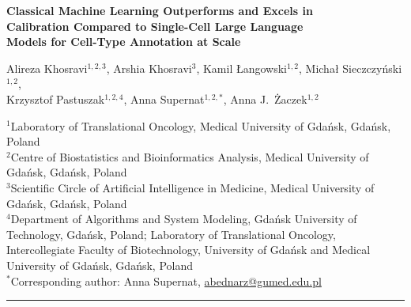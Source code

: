 \documentclass[11pt,a4paper]{article}
\begin{document}
\begin{titlepage}
\begin{center}

\vspace*{1cm}

{\LARGE\bfseries\color{darkblue}
Classical Machine Learning Outperforms and Excels in\\[4pt]
Calibration Compared to Single-Cell Large Language\\[4pt]
Models for Cell-Type Annotation at Scale
}

\vspace{1.5cm}

{\large
Alireza Khosravi$^{1,2,3}$,\quad
Arshia Khosravi$^{3}$,\quad
Kamil {\L}angowski$^{1,2}$,\quad
Micha{\l} Sieczczy{\'n}ski$^{1,2}$,\\[4pt]
Krzysztof Pastuszak$^{1,2,4}$,\quad
Anna Supernat$^{1,2,*}$,\quad
Anna J.~{\.Z}aczek$^{1,2}$
}

\vspace{0.8cm}

\begin{footnotesize}
$^{1}$Laboratory of Translational Oncology, Medical University of Gda\'nsk, Gda\'nsk, Poland\\
$^{2}$Centre of Biostatistics and Bioinformatics Analysis, Medical University of Gda\'nsk, Gda\'nsk, Poland\\
$^{3}$Scientific Circle of Artificial Intelligence in Medicine, Medical University of Gda\'nsk, Gda\'nsk, Poland\\
$^{4}$Department of Algorithms and System Modeling, Gda\'nsk University of Technology, Gda\'nsk, Poland; Laboratory of Translational Oncology, Intercollegiate Faculty of Biotechnology, University of Gda\'nsk and Medical University of Gda\'nsk, Gda\'nsk, Poland\\[6pt]
$^{*}$Corresponding author: Anna Supernat, \href{mailto:abednarz@gumed.edu.pl}{abednarz@gumed.edu.pl}
\end{footnotesize}

\vspace{1.5cm}

\hrule
\vspace{0.4cm}

\begin{abstract}
\noindent
\textbf{Background.} Single-cell large language models (scLLMs) such as scGPT have attracted substantial attention for cell-type annotation in single-cell RNA sequencing (scRNA-seq), yet their statistical calibration and reliability under realistic transfer conditions remain critically underexplored. Cell-type annotation is a foundational step of every single-cell analysis, and overconfident incorrect predictions in this step can mislead all downstream biological interpretation, particularly in clinical and translational settings.


\end{abstract}
\end{center}
\end{titlepage}
\end{document}

